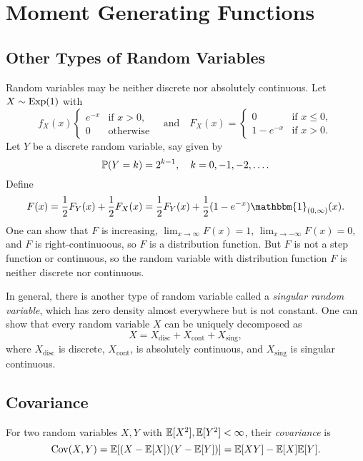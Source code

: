 \chapter{Moment Generating Functions}

\section{Other Types of Random Variables}
\begin{remark}
  Random variables may be neither discrete nor
  absolutely continuous. Let $X \sim \operatorname{Exp}(1)$ with
  \[
    f_X(x)
    \begin{cases}
      e^{-x} & \text{if $x > 0$}, \\
      0 & \text{otherwise}
    \end{cases}
    \quad \text{and} \quad
    F_X(x) =
    \begin{cases}
      0 & \text{if $x \leq 0$}, \\
      1 - e^{-x} & \text{if $x > 0$}.
    \end{cases}
  \]
  Let $Y$ be a discrete random variable, say
  given by
  \[
    \mathbb{P}(Y = k) = 2^{k - 1}, \quad k = 0, -1, -2, \ldots.
  \]
  Define
  \[
    F(x) = \frac{1}{2} F_Y(x) + \frac{1}{2} F_X(x)
    = \frac{1}{2} F_Y(x) + \frac{1}{2}(1 - e^{-x}) \mathbbm{1}_{(0, \infty)}(x).
  \]
  One can show that
  $F$ is increasing, $\lim_{x \to \infty} F(x) = 1$,
  $\lim_{x \to -\infty} F(x) = 0$, and $F$ is
  right-continuoous, so $F$ is a distribution function.
  But $F$ is not a step function or continuous, so
  the random variable with distribution function
  $F$ is neither discrete nor continuous.
\end{remark}

\begin{remark}
  In general, there is another type of random
  variable called a \emph{singular random variable},
  which has zero density almost everywhere but is
  not constant. One can show that every random
  variable $X$ can be uniquely decomposed as
  \[
    X = X_{\text{disc}} + X_{\text{cont}} + X_{\text{sing}},
  \]
  where $X_{\text{disc}}$ is discrete, $X_{\text{cont}}$,
  is absolutely continuous, and
  $X_{\text{sing}}$ is singular continuous.
\end{remark}

\section{Covariance}
\begin{definition}
  For two random variables $X, Y$ with
  $\mathbb{E}[X^2], \mathbb{E}[Y^2] < \infty$, their \emph{covariance}
  is
  \[
    \operatorname{Cov}(X, Y) = \mathbb{E}[(X - \mathbb{E}[X])(Y - \mathbb{E}[Y])]
    = \mathbb{E}[XY] - \mathbb{E}[X]\mathbb{E}[Y].
  \]
\end{definition}

